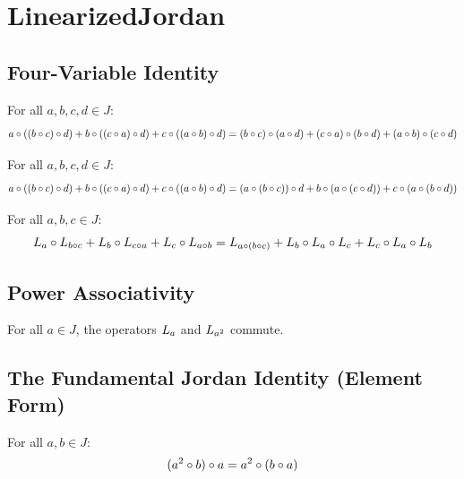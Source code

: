 \section{LinearizedJordan}

\subsection{Four-Variable Identity}

\begin{theorem}
For all $a, b, c, d \in J$:
\[
a \circ ((b \circ c) \circ d) + b \circ ((c \circ a) \circ d) + c \circ ((a \circ b) \circ d) = (b \circ c) \circ (a \circ d) + (c \circ a) \circ (b \circ d) + (a \circ b) \circ (c \circ d)
\]
\end{theorem}

\begin{theorem}
For all $a, b, c, d \in J$:
\[
a \circ ((b \circ c) \circ d) + b \circ ((c \circ a) \circ d) + c \circ ((a \circ b) \circ d) = (a \circ (b \circ c)) \circ d + b \circ (a \circ (c \circ d)) + c \circ (a \circ (b \circ d))
\]
\end{theorem}

\begin{theorem}
For all $a, b, c \in J$:
\[
L_{a} \circ L_{b \circ c} + L_{b} \circ L_{c \circ a} + L_{c} \circ L_{a \circ b} = L_{a \circ (b \circ c)} + L_{b} \circ L_{a} \circ L_{c} + L_{c} \circ L_{a} \circ L_{b}
\]
\end{theorem}

\subsection{Power Associativity}

\begin{theorem}
For all $a \in J$, the operators $L_{a}$ and $L_{a^{2}}$ commute.
\end{theorem}

\subsection{The Fundamental Jordan Identity (Element Form)}

\begin{theorem}
For all $a, b \in J$:
\[
(a^{2} \circ b) \circ a = a^{2} \circ (b \circ a)
\]
\end{theorem}

